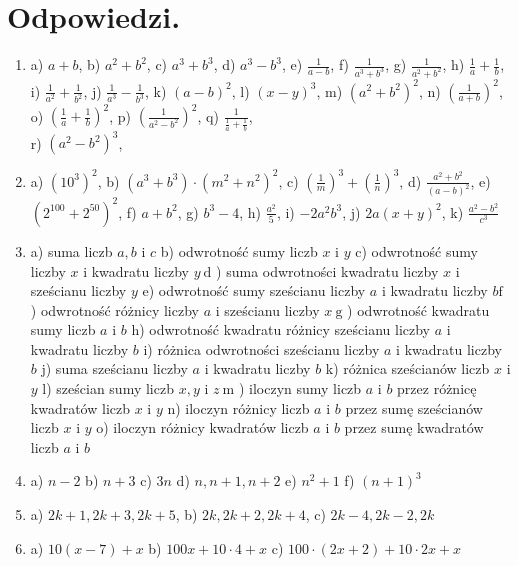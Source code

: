 \documentclass[10pt]{article}
\begin{document}
\section*{Odpowiedzi.}
\begin{enumerate}
  \item a) \(a+b\), b) \(a^{2}+b^{2}\), c) \(a^{3}+b^{3}\), d) \(a^{3}-b^{3}\), e) \(\frac{1}{a-b}\), f) \(\frac{1}{a^{3}+b^{3}}\), g) \(\frac{1}{a^{2}+b^{2}}\), h) \(\frac{1}{a}+\frac{1}{b}\), i) \(\frac{1}{a^{2}}+\frac{1}{b^{2}}\), j) \(\frac{1}{a^{3}}-\frac{1}{b^{3}}\), k) \((a-b)^{2}\), l) \((x-y)^{3}\), m) \(\left(a^{2}+b^{2}\right)^{2}\), n) \(\left(\frac{1}{a+b}\right)^{2}\), o) \(\left(\frac{1}{a}+\frac{1}{b}\right)^{2}\), p) \(\left(\frac{1}{a^{2}-b^{2}}\right)^{2}\), q) \(\frac{1}{\frac{1}{a}+\frac{1}{b}}\),\\
r) \(\left(a^{2}-b^{2}\right)^{3}\),
  \item a) \(\left(10^{3}\right)^{2}\), b) \(\left(a^{3}+b^{3}\right) \cdot\left(m^{2}+n^{2}\right)^{2}\), c) \(\left(\frac{1}{m}\right)^{3}+\left(\frac{1}{n}\right)^{3}\), d) \(\frac{a^{2}+b^{2}}{(a-b)^{2}}\), e) \(\left(2^{100}+2^{50}\right)^{2}\), f) \(a+b^{2}\), g) \(b^{3}-4\), h) \(\frac{a^{2}}{5}\), i) \(-2 a^{2} b^{3}\), j) \(2 a(x+y)^{2}\), k) \(\frac{a^{2}-b^{2}}{c^{3}}\)
  \item a) suma liczb \(a, b\) i \(c\) b) odwrotność sumy liczb \(x\) i \(y\) c) odwrotność sumy liczby \(x\) i kwadratu liczby \(y \mathrm{~d}\) ) suma odwrotności kwadratu liczby \(x\) i sześcianu liczby \(y\) e) odwrotność sumy sześcianu liczby \(a\) i kwadratu liczby \(b \mathrm{f}\) ) odwrotność różnicy liczby \(a\) i sześcianu liczby \(x \mathrm{~g}\) ) odwrotność kwadratu sumy liczb \(a\) i \(b\) h) odwrotność kwadratu różnicy sześcianu liczby \(a\) i kwadratu liczby \(b\) i) różnica odwrotności sześcianu liczby \(a\) i kwadratu liczby \(b\) j) suma sześcianu liczby \(a\) i kwadratu liczby \(b\) k) różnica sześcianów liczb \(x\) i \(y\) l) sześcian sumy liczb \(x, y\) i \(z \mathrm{~m}\) ) iloczyn sumy liczb \(a\) i \(b\) przez różnicę kwadratów liczb \(x\) i \(y\) n) iloczyn różnicy liczb \(a\) i \(b\) przez sumę sześcianów liczb \(x\) i \(y\) o) iloczyn różnicy kwadratów liczb \(a\) i \(b\) przez sumę kwadratów liczb \(a\) i \(b\)
  \item a) \(n-2\) b) \(n+3\) c) \(3 n\) d) \(n, n+1, n+2\) e) \(n^{2}+1\) f) \((n+1)^{3}\)
  \item a) \(2 k+1,2 k+3,2 k+5\), b) \(2 k, 2 k+2,2 k+4\), c) \(2 k-4,2 k-2,2 k\)
  \item a) \(10(x-7)+x\) b) \(100 x+10 \cdot 4+x\) c) \(100 \cdot(2 x+2)+10 \cdot 2 x+x\)\\

\end{enumerate}
\end{document}
